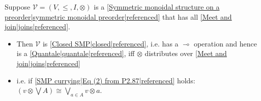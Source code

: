 
Suppose $\mathcal{V}=(V,\leq,I,\otimes)$ is a \ref{Symmetric monoidal structure on a preorder|symmetric monoidal preorder|referenced} that has all \ref{Meet and join|joins|referenced}.
    \begin{itemize}
      \item Then $\mathcal{V}$ is \ref{Closed SMP|closed|referenced}, i.e. has a $\multimap$ operation and hence is a \ref{Quantale|quantale|referenced}, iff $\otimes$ distributes over \ref{Meet and join|joins|referenced}
      \item i.e. if \ref{SMP currying|Eq (2) from P2.87|referenced} holds:  $(v \otimes \bigvee A)\cong  \bigvee_{a \in A} v \otimes a$.
    \end{itemize}